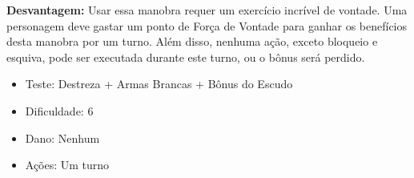 {\bf Desvantagem:} Usar essa manobra requer um exercício incrível de vontade. Uma personagem deve gastar um ponto de Força de Vontade para ganhar os benefícios desta manobra por um turno. Além disso, nenhuma ação, exceto bloqueio e esquiva, pode ser executada durante este turno, ou o bônus será perdido.
\begin{itemize}[noitemsep]
\item Teste: Destreza + Armas Brancas + Bônus do Escudo
\item Dificuldade: 6
\item Dano: Nenhum
\item Ações: Um turno
\end{itemize}
